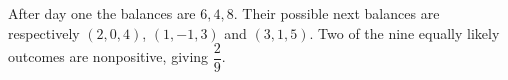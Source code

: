 After day one the balances are $6,4,8$. Their possible next balances are respectively $(2,0,4)$, $(1,-1,3)$ and $(3,1,5)$. Two of the nine equally likely outcomes are nonpositive, giving $\boxed{\dfrac{2}{9}}$.
